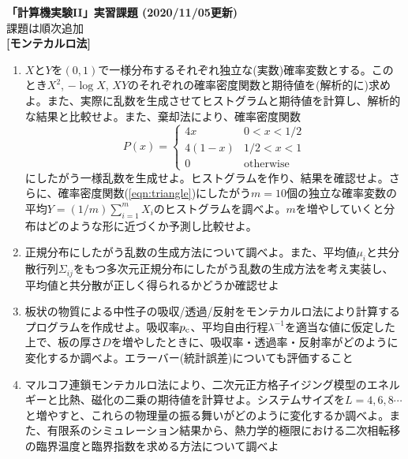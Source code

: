 \documentclass[11pt]{jarticle}
\begin{document}
\noindent
{\bf\large 「計算機実験II」実習課題 (2020/11/05更新)}
\\[-0.5em]

\noindent
課題は順次追加\\[-0.5em]


{\bf [モンテカルロ法]}
\begin{enumerate}

\item $X$と$Y$を$(0,1)$で一様分布するそれぞれ独立な(実数)確率変数とする。このとき$X^2$, $-\log X$, $XY$のそれぞれの確率密度関数と期待値を(解析的に)求めよ。また、実際に乱数を生成させてヒストグラムと期待値を計算し、解析的な結果と比較せよ。また、棄却法により、確率密度関数
  \begin{equation}
    P(x) = \begin{cases} 4x & 0 < x < 1/2 \\
      4(1-x) & 1/2 < x < 1 \\
      0 & \text{otherwise}
    \end{cases}
    \label{eqn:triangle}
  \end{equation}
  にしたがう一様乱数を生成せよ。ヒストグラムを作り、結果を確認せよ。さらに、確率密度関数(\ref{eqn:triangle})にしたがう$m=10$個の独立な確率変数の平均$Y=(1/m) \sum_{i=1}^m X_i$のヒストグラムを調べよ。$m$を増やしていくと分布はどのような形に近づくか予測し比較せよ。
  
\item 正規分布にしたがう乱数の生成方法について調べよ。また、平均値$\mu_i$と共分散行列$\Sigma_{ij}$をもつ多次元正規分布にしたがう乱数の生成方法を考え実装し、平均値と共分散が正しく得られるかどうか確認せよ

\item 板状の物質による中性子の吸収/透過/反射をモンテカルロ法により計算するプログラムを作成せよ。吸収率$p_{\rm c}$、平均自由行程$\lambda^{-1}$を適当な値に仮定した上で、板の厚さ$D$を増やしたときに、吸収率・透過率・反射率がどのように変化するか調べよ。エラーバー(統計誤差)についても評価すること

\item マルコフ連鎖モンテカルロ法により、二次元正方格子イジング模型のエネルギーと比熱、磁化の二乗の期待値を計算せよ。システムサイズを$L=4, 6,8\cdots$と増やすと、これらの物理量の振る舞いがどのように変化するか調べよ。また、有限系のシミュレーション結果から、熱力学的極限における二次相転移の臨界温度と臨界指数を求める方法について調べよ


\end{enumerate}
\end{document}
